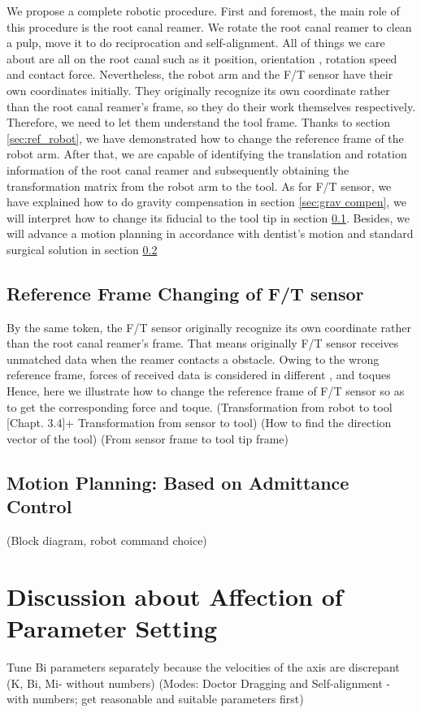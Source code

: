 We propose a complete robotic procedure. First and foremost, the main role of this procedure is the root canal reamer. We rotate the root canal reamer to clean a pulp, move it to do reciprocation and self-alignment. All of things we care about are all on the root canal such as it position, orientation , rotation speed and contact force. Nevertheless, the robot arm and the F/T sensor have their own coordinates initially. They originally recognize its own coordinate rather than the root canal reamer's frame, so they do their work themselves respectively. Therefore, we need to let them understand the tool frame. Thanks to section \ref{sec:ref_robot}, we have demonstrated how to change the reference frame of the robot arm. After that, we are capable of identifying the translation and rotation information of the root canal reamer and subsequently obtaining the transformation matrix from the robot arm to the tool. As for F/T sensor, we have explained how to do gravity compensation in section \ref{sec:grav compen}, we will interpret how to change its fiducial to the tool tip in section \ref{sec:rfc}. Besides, we will advance a motion planning in accordance with dentist's motion and standard surgical solution in section \ref{sec:motion planning} 
\subsection{Reference Frame Changing of F/T sensor}
\label{sec:rfc}
By the same token, the F/T sensor originally recognize its own coordinate rather than the root canal reamer's frame. That means originally F/T sensor receives unmatched data when the reamer contacts a obstacle. Owing to the wrong reference frame, forces of received data is considered in different , and toques  Hence, here we illustrate how to change the reference frame of F/T sensor so as to get the corresponding force and toque.
(Transformation from robot to tool [Chapt. 3.4]+ Transformation from sensor to tool) 
(How to find the direction vector of the tool)
(From sensor frame to tool tip frame)
\subsection{Motion Planning: Based on Admittance Control}
\label{sec:motion planning} 
(Block diagram, robot command choice)
\section{Discussion about Affection of Parameter Setting}
\label{sec:affection}
Tune Bi parameters separately because the velocities of the axis are discrepant
(K, Bi, Mi- without numbers)
(Modes: Doctor Dragging and Self-alignment - with numbers; get reasonable and suitable parameters first)